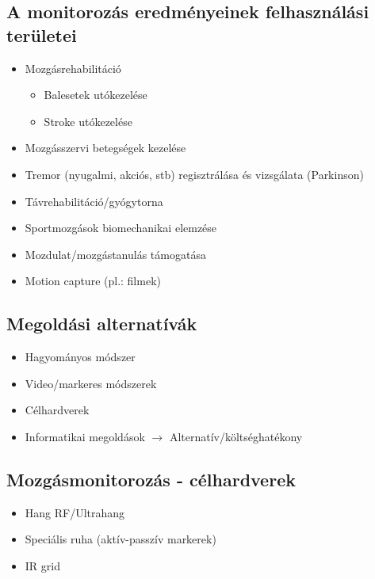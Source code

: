 \subsection{A monitorozás eredményeinek felhasználási területei}
\begin{itemize}
    \item Mozgásrehabilitáció
    \begin{itemize}
        \item Balesetek utókezelése
        \item Stroke utókezelése
    \end{itemize}
    \item Mozgásszervi betegségek kezelése
    \item Tremor (nyugalmi, akciós, stb) regisztrálása és vizsgálata (Parkinson)
    \item Távrehabilitáció/gyógytorna
    \item Sportmozgások biomechanikai elemzése
    \item Mozdulat/mozgástanulás támogatása
    \item Motion capture (pl.: filmek)
\end{itemize}

\subsection{Megoldási alternatívák}
\begin{itemize}
    \item Hagyományos módszer
    \item Video/markeres módszerek
    \item Célhardverek
    \item Informatikai megoldások $\rightarrow$ Alternatív/költséghatékony
\end{itemize}

\subsection{Mozgásmonitorozás - célhardverek}
\begin{itemize}
    \item Hang RF/Ultrahang
    \item Speciális ruha (aktív-passzív markerek)
    \item IR grid
\end{itemize}

